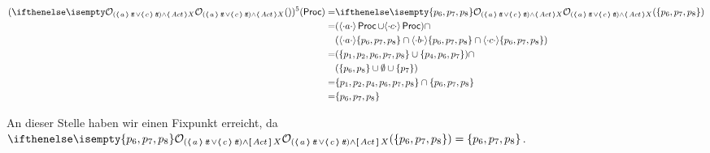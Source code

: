 \begin{align*}
(\OSem{ (\poss{a} \true \lor \poss{c} \true ) \land \poss{Act} X }{})^5 (\Proc)
=& \OSem{ (\poss{a} \true \lor \poss{c} \true ) \land \poss{Act} X }
   { \{ p_6, p_7, p_8 \}} \\
=& ( \possDenot{a} \Proc \cup \possDenot{c}\Proc) \cap \\
  &(\possDenot{a} \{ p_6, p_7, p_8 \} \cap
  \possDenot{b} \{ p_6, p_7, p_8 \}  \cap
  \possDenot{c}  \{ p_6, p_7, p_8 \})\\
=& (\{ p_1, p_2, p_6, p_7, p_8 \} \cup \{p_4, p_6, p_7\}) \cap\\
   &(\{ p_6, p_8 \} \cup
   \emptyset \cup
   \{ p_7\}) \\
=& \{p_1, p_2, p_4, p_6, p_7, p_8 \} \cap  \{ p_6, p_7, p_8 \} \\
=& \{ p_6, p_7, p_8 \}
\end{align*}

An dieser Stelle haben wir einen Fixpunkt erreicht, da \\
$ \OSem {(\poss {a} \true \lor \poss{c} \true ) \land \necess {Act} X }{ \{ p_6, p_7, p_8 \}}
= \{ p_6, p_7, p_8 \} $.
